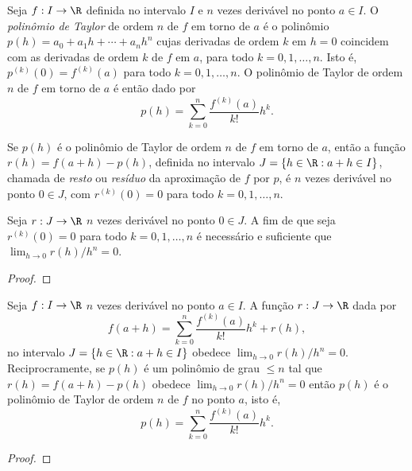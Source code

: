 \documentclass{article}
\begin{document}
\begin{defn}
    Seja \(f: I \to \R\) definida no intervalo \(I\) e \(n\) vezes derivável no ponto \(a \in I\). O \emph{polinômio de Taylor} de ordem \(n\) de \(f\) em torno de \(a\) é o polinômio \(p(h) = a_0 + a_1 h + \cdots + a_n h^n\) cujas derivadas de ordem \(k\) em \(h=0\) coincidem com as derivadas de ordem \(k\) de \(f\) em \(a\), para todo \(k = 0, 1, \ldots, n\). Isto é, \(p^{(k)}(0) = f^{(k)}(a)\) para todo \(k = 0, 1, \ldots, n\). O polinômio de Taylor de ordem \(n\) de \(f\) em torno de \(a\) é então dado por
\begin{equation}
    p(h) = \sum_{k=0}^{n} \frac{f^{(k)}(a)}{k!} h^k.
\end{equation}

    Se \(p(h)\) é o polinômio de Taylor de ordem \(n\) de \(f\) em torno de \(a\), então a função \(r(h) = f(a+h) - p(h)\), definida no intervalo \(J = \{h \in \R : a+h \in I\}\), chamada de \emph{resto} ou \emph{resíduo} da aproximação de \(f\) por \(p\), é \(n\) vezes derivável no ponto \(0 \in J\), com \(r^{(k)}(0) = 0\) para todo \(k = 0, 1, \ldots, n\).
\end{defn}

\begin{lem}
    Seja \(r: J \to \R\) \(n\) vezes derivável no ponto \(0 \in J\). A fim de que seja \(r^{(k)}(0) = 0\) para todo \(k = 0, 1, \ldots, n\) é necessário e suficiente que \(\lim_{h \to 0} r(h)/h^n = 0\).
\end{lem}

\begin{proof}
    
\end{proof}

\begin{thm} 
    Seja \(f: I \to \R\) \(n\) vezes derivável no ponto \(a \in I\). A função \(r: J \to \R\) dada por \[f(a+h) = \sum_{k=0}^{n} \frac{f^{(k)}(a)}{k!} h^k + r(h),\] no intervalo \(J = \{h \in \R : a+h \in I\}\) obedece \(\lim_{h \to 0} r(h)/h^n = 0\). Reciprocramente, se \(p(h)\) é um polinômio de grau \(\leq n\) tal que \(r(h) = f(a+h) - p(h)\) obedece \(\lim_{h \to 0} r(h)/h^n = 0\) então \(p(h)\) é o polinômio de Taylor de ordem \(n\) de \(f\) no ponto \(a\), isto é, \[p(h) = \sum_{k=0}^{n} \frac{f^{(k)}(a)}{k!} h^k.\]
\end{thm}

\begin{proof}
    
\end{proof}
\end{document}
